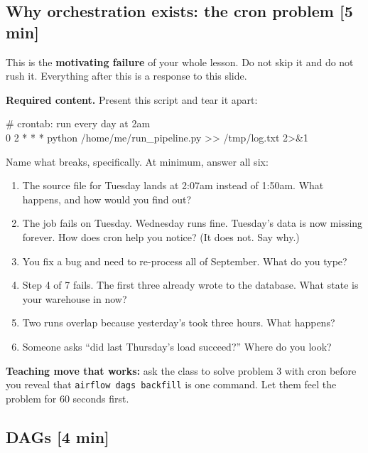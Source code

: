 \documentclass[11pt]{article}
\newcommand{\tm}[1]{\textcolor{grayish}{\small\textsf{[#1]}}}
\begin{document}
\subsection{Why orchestration exists: the cron problem \tm{5 min}}

This is the \textbf{motivating failure} of your whole lesson. Do not skip it
and do not rush it. Everything after this is a response to this slide.

\textbf{Required content.} Present this script and tear it apart:

\begin{codebox}
\# crontab: run every day at 2am\\
0 2 * * * python /home/me/run\_pipeline.py >> /tmp/log.txt 2>\&1
\end{codebox}

\begin{qbox}
Name what breaks, specifically. At minimum, answer all six:
\begin{enumerate}
  \item The source file for Tuesday lands at 2:07am instead of 1:50am. What
        happens, and how would you find out?
  \item The job fails on Tuesday. Wednesday runs fine. Tuesday's data is now
        missing forever. How does cron help you notice? (It does not. Say why.)
  \item You fix a bug and need to re-process all of September. What do you type?
  \item Step 4 of 7 fails. The first three already wrote to the database.
        What state is your warehouse in now?
  \item Two runs overlap because yesterday's took three hours. What happens?
  \item Someone asks ``did last Thursday's load succeed?'' Where do you look?
\end{enumerate}
\end{qbox}

\begin{dobox}
\textbf{Teaching move that works:} ask the class to solve problem 3 with cron
before you reveal that \texttt{airflow dags backfill} is one command. Let them
feel the problem for 60 seconds first.
\end{dobox}

\subsection{DAGs \tm{4 min}}
\end{document}
